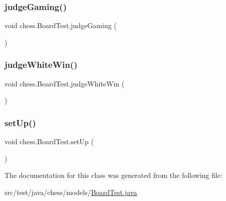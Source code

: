 \subsubsection{\texorpdfstring{judge\+Gaming()}{judgeGaming()}}
{\footnotesize\ttfamily void chess.\+Board\+Test.\+judge\+Gaming (\begin{DoxyParamCaption}{ }\end{DoxyParamCaption})}

\mbox{\label{classchess_1_1_board_test_a9eba77bc50638d378f650d30ea79f44b}} 
\subsubsection{\texorpdfstring{judge\+White\+Win()}{judgeWhiteWin()}}
{\footnotesize\ttfamily void chess.\+Board\+Test.\+judge\+White\+Win (\begin{DoxyParamCaption}{ }\end{DoxyParamCaption})}

\mbox{\label{classchess_1_1_board_test_acd0ea30fd3e9742c6b71a5ee60b65707}} 
\subsubsection{\texorpdfstring{set\+Up()}{setUp()}}
{\footnotesize\ttfamily void chess.\+Board\+Test.\+set\+Up (\begin{DoxyParamCaption}{ }\end{DoxyParamCaption})}



The documentation for this class was generated from the following file\+:\begin{DoxyCompactItemize}
\item 
src/test/java/chess/models/\mbox{\hyperlink{_board_test_8java}{Board\+Test.\+java}}\end{DoxyCompactItemize}
